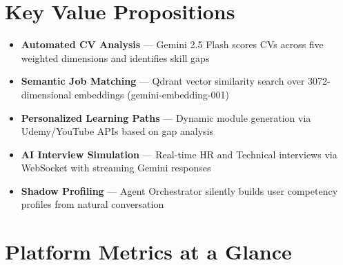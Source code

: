 \documentclass[12pt, a4paper]{report}
\begin{document}
\vspace{0.5cm}

\section{Key Value Propositions}

\begin{itemize}[leftmargin=*, label=\textcolor{primary}{\faCheckCircle}]
  \item \textbf{Automated CV Analysis} — Gemini 2.5 Flash scores CVs across five weighted dimensions and identifies skill gaps
  \item \textbf{Semantic Job Matching} — Qdrant vector similarity search over 3072-dimensional embeddings (gemini-embedding-001)
  \item \textbf{Personalized Learning Paths} — Dynamic module generation via Udemy/YouTube APIs based on gap analysis
  \item \textbf{AI Interview Simulation} — Real-time HR and Technical interviews via WebSocket with streaming Gemini responses
  \item \textbf{Shadow Profiling} — Agent Orchestrator silently builds user competency profiles from natural conversation
\end{itemize}

\vspace{0.5cm}

\section{Platform Metrics at a Glance}

\begin{center}
\end{center}

\end{document}
